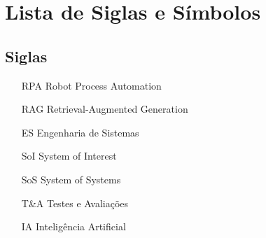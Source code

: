 
\newpage
\chapter*{Lista de Siglas e Símbolos} %

	\section*{Siglas}
	
		\begin{itemize}[labelwidth=5em,leftmargin=\dimexpr{}+\relax,align=left]
			\item[RPA] Robot Process Automation
			\item[RAG] Retrieval-Augmented Generation
			\item[ES] Engenharia de Sistemas
			\item[SoI] System of Interest
			\item[SoS] System of Systems
			\item[T\&A] Testes e Avaliações
			\item[IA] Inteligência Artificial
		\end{itemize}
	
		\thispagestyle{empty}

	
	
